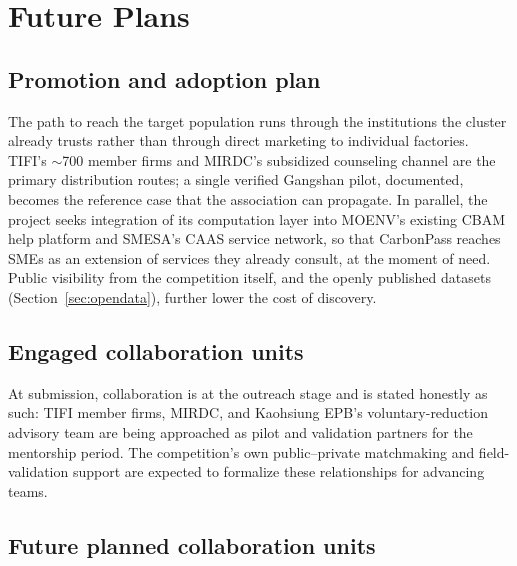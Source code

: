 \section{Future Plans}\label{sec:future}

\subsection{Promotion and adoption plan}\label{sec:promo}

The path to reach the target population runs through the institutions the
cluster already trusts rather than through direct marketing to individual
factories. TIFI's $\sim$700 member firms and MIRDC's subsidized counseling
channel are the primary distribution routes; a single verified Gangshan pilot,
documented, becomes the reference case that the association can propagate. In
parallel, the project seeks integration of its computation layer into MOENV's
existing CBAM help platform and SMESA's CAAS service network\cite{tpt-cbam,caas},
so that CarbonPass reaches SMEs as an extension of services they already
consult, at the moment of need. Public visibility from the competition itself,
and the openly published datasets (Section~\ref{sec:opendata}), further lower
the cost of discovery.

\subsection{Engaged collaboration units}\label{sec:engaged}

At submission, collaboration is at the outreach stage and is stated honestly as
such: TIFI member firms, MIRDC, and Kaohsiung EPB's voluntary-reduction
advisory team are being approached as pilot and validation partners for the
mentorship period. The competition's own public--private matchmaking and
field-validation support are expected to formalize these relationships for
advancing teams\cite{handbook}.

\subsection{Future planned collaboration units}\label{sec:planned}


